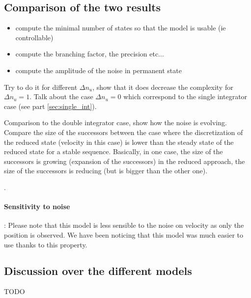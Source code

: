 \subsection{Comparison of the two results}
\begin{itemize}
\item compute the minimal number of states so that the model is usable (ie controllable)
\item compute the branching factor, the precision etc...
\item compute the amplitude of the noise in permanent state
\end{itemize}

Try to do it for different $\Delta n_u$, show that it does decrease the complexity for $\Delta n_u = 1$. Talk about the case $\Delta n_u = 0$ which correspond to the single integrator case (see part \ref{sec:single_int}).

Comparison to the double integrator case, show how the noise is evolving. Compare the size of the successors between the case where the discretization of the reduced state (velocity in this case) is lower than the steady state of the reduced state for a stable sequence. Basically, in one case, the size of the successors is growing (expansion of the successors) in the reduced approach, the size of the successors is reducing (but is bigger than the other one).


.

\paragraph{Sensitivity to noise}:
Please note that this model is less sensible to the noise on velocity as only the position is observed.
We have been noticing that this model was much easier to use thanks to this property.

\subsection{Discussion over the different models}
TODO


